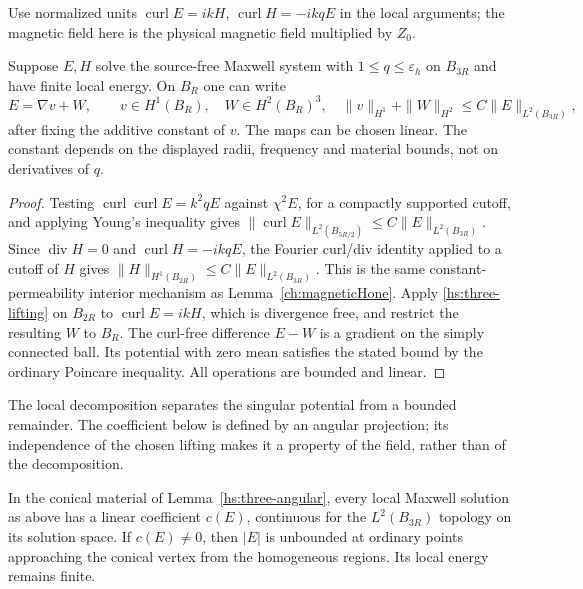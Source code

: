 Use normalized units $\operatorname{curl}E=ikH$,
$\operatorname{curl}H=-ikqE$ in the local arguments; the magnetic
field here is the physical magnetic field multiplied by $Z_0$.

\begin{lemma}
\label{hs:three-decomposition}
Suppose $E,H$ solve the source-free Maxwell system with
$1\leq q\leq\varepsilon_h$ on $B_{3R}$ and have finite local energy.
On $B_R$ one can write
\begin{equation}
 E=\nabla v+W,\qquad v\in H^1(B_R),\quad W\in H^2(B_R)^3,
 \quad
 \|v\|_{H^1}+\|W\|_{H^2}\leq C\|E\|_{L^2(B_{3R})},
 \label{hs:three-decomposition-bound}
\end{equation}
after fixing the additive constant of $v$.  The maps can be chosen
linear.  The constant depends on the displayed radii, frequency and
material bounds, not on derivatives of $q$.
\end{lemma}

\begin{proof}
Testing $\operatorname{curl}\operatorname{curl}E=k^2qE$ against
$\chi^2E$, for a compactly supported cutoff, and applying Young's
inequality gives
$\|\operatorname{curl}E\|_{L^2(B_{5R/2})}
\leq C\|E\|_{L^2(B_{3R})}$.
Since $\operatorname{div}H=0$ and
$\operatorname{curl}H=-ikqE$, the Fourier curl/div identity applied
to a cutoff of $H$ gives
$\|H\|_{H^1(B_{2R})}\leq C\|E\|_{L^2(B_{3R})}$.
This is the same constant-permeability interior mechanism as
Lemma~\ref{ch:magneticHone}.  Apply \eqref{hs:three-lifting} on
$B_{2R}$ to $\operatorname{curl}E=ikH$, which is divergence free,
and restrict the resulting $W$ to $B_R$.
The curl-free difference $E-W$ is a gradient on the simply connected
ball.  Its potential with zero mean satisfies the stated bound by
the ordinary Poincare inequality.  All operations are bounded and
linear.
\end{proof}

The local decomposition separates the singular potential from a bounded
remainder. The coefficient below is defined by an angular projection;
its independence of the chosen lifting makes it a property of the field,
rather than of the decomposition.

\begin{lemma}
\label{hs:three-coefficient}
In the conical material of Lemma~\ref{hs:three-angular}, every local
Maxwell solution as above has a linear coefficient $c(E)$, continuous
for the $L^2(B_{3R})$ topology on its solution space.  If $c(E)\ne0$,
then $|E|$ is unbounded at ordinary points approaching the conical
vertex from the homogeneous regions.  Its local energy remains finite.
\end{lemma}

